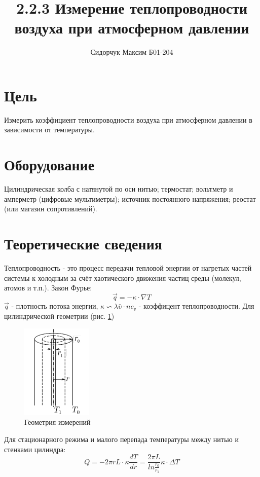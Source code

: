 \documentclass[a4paper,12pt]{article} %
\author{Сидорчук Максим Б01-204}
\title{2.2.3 Измерение теплопроводности воздуха при атмосферном давлении}
\date{}
\begin{document}
\maketitle
\section{Цель} Измерить коэффициент теплопроводности воздуха при атмосферном
давлении в зависимости от температуры.
\section{Оборудование} Цилиндрическая колба с натянутой по оси нитью; термостат;
вольтметр и амперметр (цифровые мультиметры); источник
постоянного напряжения; реостат (или магазин сопротивлений).
\section{Теоретические сведения}
Теплопроводность - это процесс передачи тепловой энергии от нагретых
частей системы к холодным за счёт хаотического движения частиц среды (молекул, атомов и т.п.). Закон Фурье:
\begin{equation}
	\overrightarrow{q}=-\kappa\cdot \nabla T
\end{equation}
$\overrightarrow{q}$ - плотность потока энергии, $\kappa \backsim \lambda\bar{\upsilon}\cdot nc_v$ - коэффицент теплопроводности.
Для цилиндрической геометрии (рис. \ref{цилиндр})
\begin{figure}[H]
	\begin{center}
		\includegraphics[width=0.3\textwidth]{Цилиндр}
	\end{center}
	\caption{Геометрия измерений} \label{цилиндр}
\end{figure}
Для стационарного режима и малого перепада температуры между нитью и стенками цилиндра:
\begin{equation}
	Q = -2\pi r L\cdot \kappa \frac{dT}{dr}=\frac{2\pi L}{ln\frac{r_0}{r_1}}\kappa\cdot \Delta T
\end{equation}
\end{document}
